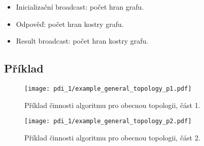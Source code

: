 \begin{itemize}
    \item Inicializační broadcast: počet hran grafu.
    \item Odpověď: počet hran kostry grafu.
    \item Result broadcast: počet hran kostry grafu.
\end{itemize}

\subsection*{Příklad}

\begin{figure}[H]
    \centering
    \texttt{[image: pdi\_1/example\_general\_topology\_p1.pdf]}
    \caption{Příklad činnosti algoritmu pro obecnou topologii, část 1.}
\end{figure}

\begin{figure}[H]
    \centering
    \texttt{[image: pdi\_1/example\_general\_topology\_p2.pdf]}
    \caption{Příklad činnosti algoritmu pro obecnou topologii, část 2.}
\end{figure}
